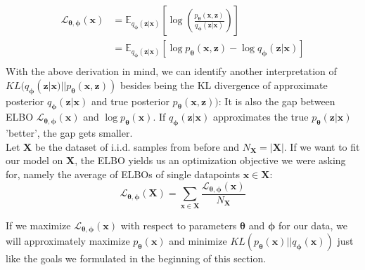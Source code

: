 \documentclass[12pt]{report}
\theoremstyle{definition}
\begin{document}
\begin{equation}
\begin{split}
	\mathcal{L}_{\mathbf{\theta}, \mathbf{\phi}}(\mathbf{x}) 
	& = \mathbb{E}_{q_{\mathbf{\phi}}(\mathbf{z}|\mathbf{x})}\left[ \log\left(\frac{p_{\mathbf{\theta}}(\mathbf{x}, \mathbf{z})}{q_{\mathbf{\phi}}(\mathbf{z}|\mathbf{x})}\right) \right] \\
	& = \mathbb{E}_{q_{\mathbf{\phi}}(\mathbf{z}|\mathbf{x})}\left[ \log p_{\mathbf{\theta}}(\mathbf{x}, \mathbf{z}) - \log q_{\mathbf{\phi}}(\mathbf{z}|\mathbf{x}) \right]	\\
\end{split}
\end{equation}
With the above derivation in mind, we can identify another interpretation of $KL(q_{\mathbf{\phi}}(\mathbf{z}|\mathbf{x}) || p_{\mathbf{\theta}}(\mathbf{x}, \mathbf{z}))$ besides being the KL divergence of approximate posterior $q_{\mathbf{\phi}}(\mathbf{z}|\mathbf{x})$ and true posterior $p_{\mathbf{\theta}}(\mathbf{x}, \mathbf{z}))$: It is also the gap between ELBO $\mathcal{L}_{\mathbf{\theta}, \mathbf{\phi}}(\mathbf{x})$ and $\log p_{\mathbf{\theta}}(\mathbf{x})$. If $q_{\mathbf{\phi}}(\mathbf{z}|\mathbf{x})$ approximates the true $p_{\mathbf{\theta}}(\mathbf{z}|\mathbf{x})$ 'better', the gap gets smaller. \\
Let $\mathbf{X}$ be the dataset of i.i.d. samples from before and $N_{\mathbf{X}} = |\mathbf{X}|$. If we want to fit our model on $\mathbf{X}$, the ELBO yields us an optimization objective we were asking for, namely the average of ELBOs of single datapoints $\mathbf{x} \in \mathbf{X}$:
\begin{equation}
	\mathcal{L}_{\mathbf{\theta}, \mathbf{\phi}}(\mathbf{X}) = \sum_{\mathbf{x} \in \mathbf{X}} \frac{\mathcal{L}_{\mathbf{\theta}, \mathbf{\phi}}(\mathbf{x})}{N_{\mathbf{X}}}
\end{equation}

If we maximize $\mathcal{L}_{\mathbf{\theta}, \mathbf{\phi}}(\mathbf{x})$ with respect to parameters $\pmb{\theta}$ and $\pmb{\phi}$ for our data, we will approximately maximize $p_{\mathbf{\theta}}(\mathbf{x})$ and minimize $KL(p_{\mathbf{\theta}}(\mathbf{x}) || q_{\mathbf{\phi}}(\mathbf{x}))$ just like the goals we formulated in the beginning of this section.
\end{document}
